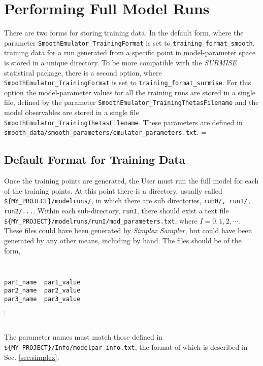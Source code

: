 \documentclass[UserManual.tex]{subfiles}
\begin{document}
\setcounter{section}{3}
\section{Performing Full Model Runs}\label{sec:fullmodel}

There are two forms for storing training data. In the default form, where the parameter {\tt SmoothEmulator\_TrainingFormat} is set to {\tt training\_format\_smooth}, training data for a run generated from a specific point in model-parameter space is stored in a unique directory. To be more compatible with the {\it SURMISE} statistical package, there is a second option, where {\tt SmoothEmulator\_TrainingFormat} is set to {\tt training\_format\_surmise}. For this option the model-parameter values for all the training runs are stored in a single file, defined by the parameter {\tt SmoothEmulator\_TrainingThetasFilename} and the model observables are stored in a single file {\tt SmoothEmulator\_TrainingThetasFilename}. These parameters are defined in {\tt smooth\_data/smooth\_parameters/emulator\_parameters.txt}. =

\subsection{Default Format for Training Data}

Once the training points are generated, the User must run the full model for each of the training points. At this point there is a directory, usually called {\tt \$\{MY\_PROJECT\}/modelruns/}, in which there are sub directories, {\tt run0/, run1/, run2/...}.  Within each sub-directory, {\tt runI}, there should exist a text file {\tt \$\{MY\_PROJECT\}/modelruns/runI/mod\_parameters.txt}, where $I=0,1,2,\cdots$. These files could have been generated by {\it Simplex Sampler}, but could have been generated by any other means, including by hand. The files should be of the form,
{\tt
\begin{verbatim}
par1_name  par1_value
par2_name  par2_value
par3_name  par3_value
\end{verbatim}\vspace*{-20pt}\hspace*{24pt}$\vdots$
}\\
The parameter names must match those defined in {\tt \$\{MY\_PROJECT\}/Info/modelpar\_info.txt}, the format of which is described in Sec. \ref{sec:simplex}. 
\end{document}
